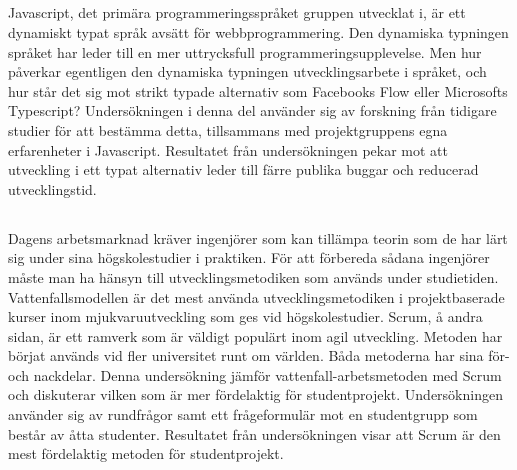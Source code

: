 \subsection*{}
Javascript, det primära programmeringsspråket gruppen utvecklat i, är ett dynamiskt typat språk avsätt för webbprogrammering. Den dynamiska typningen språket har leder till en mer uttrycksfull programmeringsupplevelse. Men hur påverkar egentligen den dynamiska typningen utvecklingsarbete i språket, och hur står det sig mot strikt typade alternativ som Facebooks Flow eller Microsofts Typescript? Undersökningen i denna del använder sig av forskning från tidigare studier för att bestämma detta, tillsammans med projektgruppens egna erfarenheter i Javascript. Resultatet från undersökningen pekar mot att utveckling i ett typat alternativ leder till färre publika buggar och reducerad utvecklingstid.

\subsection*{}
Dagens arbetsmarknad kräver ingenjörer som kan tillämpa teorin som de har lärt sig under sina högskolestudier i praktiken. För att förbereda sådana ingenjörer måste man ha hänsyn till utvecklingsmetodiken som används under studietiden. Vattenfallsmodellen är det mest använda utvecklingsmetodiken i projektbaserade kurser inom mjukvaruutveckling som ges vid högskolestudier. Scrum, å andra sidan, är ett ramverk som är väldigt populärt inom agil utveckling. Metoden har börjat används vid fler universitet runt om världen. Båda metoderna har sina för-och nackdelar. Denna undersökning jämför vattenfall-arbetsmetoden med Scrum och diskuterar vilken som är mer fördelaktig för studentprojekt. Undersökningen använder sig av rundfrågor samt ett frågeformulär mot en studentgrupp som består av åtta studenter. Resultatet från undersökningen visar att Scrum är den mest fördelaktig metoden för studentprojekt. 